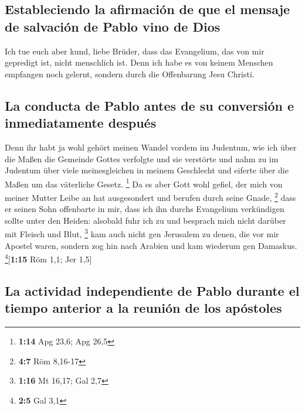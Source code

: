 \hypertarget{estableciendo-la-afirmaciuxf3n-de-que-el-mensaje-de-salvaciuxf3n-de-pablo-vino-de-dios}{%
\subsection{Estableciendo la afirmación de que el mensaje de salvación
de Pablo vino de
Dios}\label{estableciendo-la-afirmaciuxf3n-de-que-el-mensaje-de-salvaciuxf3n-de-pablo-vino-de-dios}}

 Ich tue euch aber kund, liebe Brüder, dass das
Evangelium, das von mir gepredigt ist, nicht menschlich ist.
 Denn ich habe es von keinem Menschen empfangen noch
gelernt, sondern durch die Offenbarung Jesu Christi.

\hypertarget{la-conducta-de-pablo-antes-de-su-conversiuxf3n-e-inmediatamente-despuuxe9s}{%
\subsection{La conducta de Pablo antes de su conversión e inmediatamente
después}\label{la-conducta-de-pablo-antes-de-su-conversiuxf3n-e-inmediatamente-despuuxe9s}}

 Denn ihr habt ja wohl gehört meinen Wandel vordem im
Judentum, wie ich über die Maßen die Gemeinde Gottes verfolgte und sie
verstörte  und nahm zu im Judentum über viele
meinesgleichen in meinem Geschlecht und eiferte über die Maßen um das
väterliche Gesetz. \footnote{\textbf{1:14} Apg 23,6; Apg 26,5}
 Da es aber Gott wohl gefiel, der mich von meiner Mutter
Leibe an hat ausgesondert und berufen durch seine Gnade, \footnote{\textbf{4:7}
  Röm 8,16-17}  dass er seinen Sohn offenbarte in mir,
dass ich ihn durchs Evangelium verkündigen sollte unter den Heiden:
alsobald fuhr ich zu und besprach mich nicht darüber mit Fleisch und
Blut, \footnote{\textbf{1:16} Mt 16,17; Gal 2,7}  kam
auch nicht gen Jerusalem zu denen, die vor mir Apostel waren, sondern
zog hin nach Arabien und kam wiederum gen Damaskus.
\footnote{\textbf{2:5} Gal 3,1}{[}\textbf{1:15} Röm 1,1; Jer 1,5{]}

\hypertarget{la-actividad-independiente-de-pablo-durante-el-tiempo-anterior-a-la-reuniuxf3n-de-los-apuxf3stoles}{%
\subsection{La actividad independiente de Pablo durante el tiempo
anterior a la reunión de los
apóstoles}\label{la-actividad-independiente-de-pablo-durante-el-tiempo-anterior-a-la-reuniuxf3n-de-los-apuxf3stoles}}

